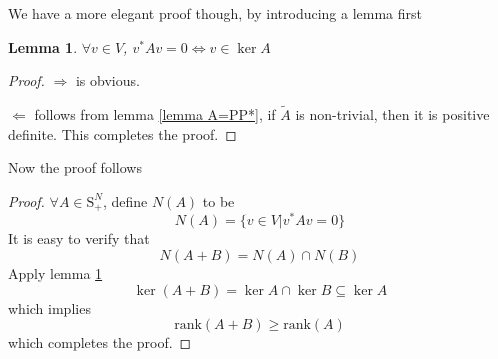 \documentclass[12pt]{article}
\newtheorem{lemma}{Lemma}
\begin{document}
We have a more elegant proof though, by introducing a lemma first
\begin{lemma}\label{lemma kerA}
	$\forall v\in V$, $v^*Av=0\Leftrightarrow v\in\ker A$
\end{lemma}
\begin{proof}
	$\Rightarrow$ is obvious. 
	
	$\Leftarrow$
	follows from lemma \ref{lemma A=PP*}, if $\tilde{A}$ is non-trivial, then it is positive definite. This completes the proof.
\end{proof}
Now the proof follows
\begin{proof}
	$\forall A\in \mbox{S}_+^N$, define $N(A)$ to be
	$$N(A)=\{v\in V|v^*Av=0 \}$$
	It is easy to verify that
	$$N(A+B)=N(A)\cap N(B)$$
	Apply lemma \ref{lemma kerA}
	$$\ker(A+B)=\ker A\cap\ker B\subseteq\ker A$$
	which implies
	$$\mbox{rank}(A+B)\geq\mbox{rank}(A)$$
	which completes the proof.
\end{proof}
\end{document}
